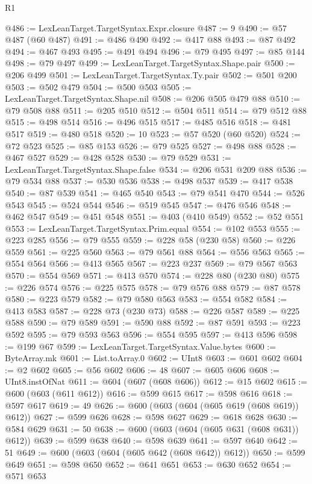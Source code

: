 \begin{lexlean}{R1}
\begin{coremodule}
@486 := LexLeanTarget.TargetSyntax.Expr.closure
@487 := 9
@490 := @57 @487 (@60 @487)
@491 := @486 @490
@492 := @417 @88
@493 := @87 @492
@494 := @467 @493
@495 := @491 @494
@496 := @79 @495
@497 := @85 @144
@498 := @79 @497
@499 := LexLeanTarget.TargetSyntax.Shape.pair
@500 := @206 @499
@501 := LexLeanTarget.TargetSyntax.Ty.pair
@502 := @501 @200
@503 := @502 @479
@504 := @500 @503
@505 := LexLeanTarget.TargetSyntax.Shape.nil
@508 := @206 @505 @479 @88
@510 := @79 @508 @88
@511 := @205 @510
@512 := @504 @511
@514 := @79 @512 @88
@515 := @498 @514
@516 := @496 @515
@517 := @485 @516
@518 := @481 @517
@519 := @480 @518
@520 := 10
@523 := @57 @520 (@60 @520)
@524 := @72 @523
@525 := @85 @153
@526 := @79 @525
@527 := @498 @88
@528 := @467 @527
@529 := @428 @528
@530 := @79 @529
@531 := LexLeanTarget.TargetSyntax.Shape.false
@534 := @206 @531 @209 @88
@536 := @79 @534 @88
@537 := @530 @536
@538 := @498 @537
@539 := @417 @538
@540 := @87 @539
@541 := @465 @540
@543 := @79 @541 @470
@544 := @526 @543
@545 := @524 @544
@546 := @519 @545
@547 := @476 @546
@548 := @462 @547
@549 := @451 @548
@551 := @403 (@410 @549)
@552 := @52 @551
@553 := LexLeanTarget.TargetSyntax.Prim.equal
@554 := @102 @553
@555 := @223 @285
@556 := @79 @555
@559 := @228 @58 (@230 @58)
@560 := @226 @559
@561 := @225 @560
@563 := @79 @561 @88
@564 := @556 @563
@565 := @554 @564
@566 := @413 @565
@567 := @223 @237
@569 := @79 @567 @563
@570 := @554 @569
@571 := @413 @570
@574 := @228 @80 (@230 @80)
@575 := @226 @574
@576 := @225 @575
@578 := @79 @576 @88
@579 := @87 @578
@580 := @223 @579
@582 := @79 @580 @563
@583 := @554 @582
@584 := @413 @583
@587 := @228 @73 (@230 @73)
@588 := @226 @587
@589 := @225 @588
@590 := @79 @589
@591 := @590 @88
@592 := @87 @591
@593 := @223 @592
@595 := @79 @593 @563
@596 := @554 @595
@597 := @413 @596
@598 := @199 @67
@599 := LexLeanTarget.TargetSyntax.Value.bytes
@600 := ByteArray.mk
@601 := List.toArray.{0}
@602 := UInt8
@603 := @601 @602
@604 := @2 @602
@605 := @56 @602
@606 := 48
@607 := @605 @606
@608 := UInt8.instOfNat
@611 := @604 (@607 (@608 @606))
@612 := @15 @602
@615 := @600 (@603 (@611 @612))
@616 := @599 @615
@617 := @598 @616
@618 := @597 @617
@619 := 49
@626 := @600 (@603 (@604 (@605 @619 (@608 @619)) @612))
@627 := @599 @626
@628 := @598 @627
@629 := @618 @628
@630 := @584 @629
@631 := 50
@638 := @600 (@603 (@604 (@605 @631 (@608 @631)) @612))
@639 := @599 @638
@640 := @598 @639
@641 := @597 @640
@642 := 51
@649 := @600 (@603 (@604 (@605 @642 (@608 @642)) @612))
@650 := @599 @649
@651 := @598 @650
@652 := @641 @651
@653 := @630 @652
@654 := @571 @653

\end{coremodule}
\end{lexlean}
